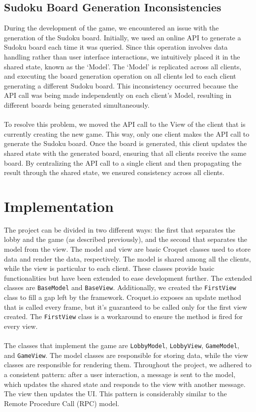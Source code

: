 \documentclass[12pt, a4paper]{report}
\begin{document}
\section{Sudoku Board Generation Inconsistencies}
During the development of the game, we encountered an issue with the generation of the Sudoku board. Initially, we used an online API to generate a Sudoku board each time it was queried. Since this operation involves data handling rather than user interface interactions, we intuitively placed it in the shared state, known as the `Model'. The `Model' is replicated across all clients, and executing the board generation operation on all clients led to each client generating a different Sudoku board. This inconsistency occurred because the API call was being made independently on each client's Model, resulting in different boards being generated simultaneously.\\
\\
To resolve this problem, we moved the API call to the View of the client that is currently creating the new game. This way, only one client makes the API call to generate the Sudoku board. Once the board is generated, this client updates the shared state with the generated board, ensuring that all clients receive the same board. By centralizing the API call to a single client and then propagating the result through the shared state, we ensured consistency across all clients.

\chapter{Implementation}
The project can be divided in two different ways: the first that separates the lobby and the game (as described previously), and the second that separates the model from the view. The model and view are basic Croquet classes used to store data and render the data, respectively. The model is shared among all the clients, while the view is particular to each client. These classes provide basic functionalities but have been extended to ease development further. The extended classes are \texttt{BaseModel} and \texttt{BaseView}. Additionally, we created the \texttt{FirstView} class to fill a gap left by the framework. Croquet.io exposes an update method that is called every frame, but it's guaranteed to be called only for the first view created. The \texttt{FirstView} class is a workaround to ensure the method is fired for every view.\\
\\
The classes that implement the game are \texttt{LobbyModel}, \texttt{LobbyView}, \texttt{GameModel}, and \texttt{GameView}. The model classes are responsible for storing data, while the view classes are responsible for rendering them. Throughout the project, we adhered to a consistent pattern: after a user interaction, a message is sent to the model, which updates the shared state and responds to the view with another message. The view then updates the UI. This pattern is considerably similar to the Remote Procedure Call (RPC) model.
\end{document}
